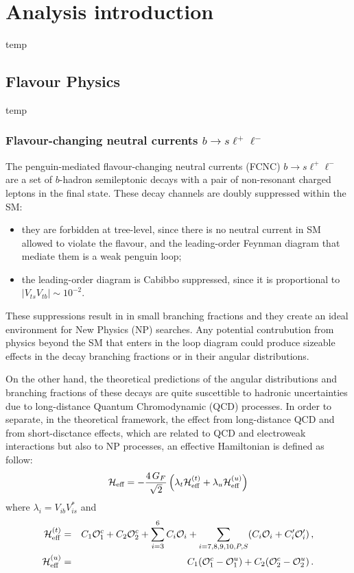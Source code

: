 \chapter{Analysis introduction}
\label{sec:theo}

temp

\section{Flavour Physics}
\label{sec:flav}

temp

\subsection[Flavour-changing neutral currents b to s l l]{Flavour-changing neutral currents $b\to s\ell^+\ell^-$}
\label{sec:FCNC}

The penguin-mediated flavour-changing neutral currents (FCNC) $b\to s\ell^+\ell^-$ are a set of $b$-hadron semileptonic decays with a pair of non-resonant charged leptons in the final state.
These decay channels are doubly suppressed within the SM:
\begin{itemize}
\item they are forbidden at tree-level, since there is no neutral current in SM allowed to violate the flavour, and the leading-order Feynman diagram that mediate them is a weak penguin loop;
\item the leading-order diagram is Cabibbo suppressed, since it is proportional to $|V_{ts}V_{tb}|\sim10^{-2}$.
\end{itemize}
These suppressions result in in small branching fractions and they create an ideal environment for New Physics (NP) searches.
Any potential contrubution from physics beyond the SM that enters in the loop diagram could produce sizeable effects in the decay branching fractions or in their angular distributions.

On the other hand, the theoretical predictions of the angular distributions and branching fractions of these decays are quite suscettible to hadronic uncertainties due to long-distance Quantum Chromodynamic (QCD) processes.
In order to separate, in the theoretical framework, the effect from long-distance QCD and from short-disctance effects, which are related to QCD and electroweak interactions but also to NP processes, an effective Hamiltonian is defined as follow:
\begin{equation} \label{eq:Heff}
  {\cal H}_{\textrm{eff}} = - \frac{4\,G_F}{\sqrt{2}}\left(\lambda_t {\cal H}_{\textrm{eff}}^{(t)} + \lambda_u {\cal H}_{\textrm{eff}}^{(u)}\right)
\end{equation}
where $\lambda_i=V_{ib}V_{is}^*$ and
\begin{eqnarray*}
  {\cal H}_{\textrm{eff}}^{(t)} & = & C_1 \mathcal O_1^c + C_2 \mathcal O_2^c + \sum_{i=3}^{6} C_i \mathcal O_i + \sum_{i=7,8,9,10,P,S} (C_i \mathcal O_i + C'_i \mathcal O'_i)\,, \\
  {\cal H}_{\textrm{eff}}^{(u)} & = & C_1 (\mathcal O_1^c-\mathcal O_1^u)  + C_2(\mathcal O_2^c-\mathcal O_2^u)\,.
\end{eqnarray*}

